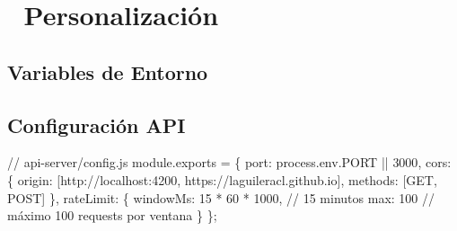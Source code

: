\documentclass[
  11pt,
  letterpaper,
  oneside,
  openany]{scrbook}
\newenvironment{Shaded}{}{}
\newcommand{\AttributeTok}[1]{\textcolor[rgb]{0.84,0.23,0.29}{#1}}
\newcommand{\BuiltInTok}[1]{\textcolor[rgb]{0.84,0.23,0.29}{#1}}
\newcommand{\CommentTok}[1]{\textcolor[rgb]{0.42,0.45,0.49}{#1}}
\newcommand{\DataTypeTok}[1]{\textcolor[rgb]{0.84,0.23,0.29}{#1}}
\newcommand{\DecValTok}[1]{\textcolor[rgb]{0.00,0.36,0.77}{#1}}
\newcommand{\FunctionTok}[1]{\textcolor[rgb]{0.44,0.26,0.76}{#1}}
\newcommand{\NormalTok}[1]{\textcolor[rgb]{0.14,0.16,0.18}{#1}}
\newcommand{\OperatorTok}[1]{\textcolor[rgb]{0.14,0.16,0.18}{#1}}
\newcommand{\StringTok}[1]{\textcolor[rgb]{0.01,0.18,0.38}{#1}}
\newcommand{\VariableTok}[1]{\textcolor[rgb]{0.89,0.38,0.04}{#1}}
\begin{document}
\section{🔧 Personalización}\label{personalizaciuxf3n-2}

\subsection{Variables de Entorno}\label{variables-de-entorno}

\begin{Shaded}
\end{Shaded}

\subsection{Configuración API}\label{configuraciuxf3n-api}

\begin{Shaded}
\begin{Highlighting}[]
\CommentTok{// api{-}server/config.js}
\NormalTok{module}\OperatorTok{.}\AttributeTok{exports} \OperatorTok{=}\NormalTok{ \{}
  \DataTypeTok{port}\OperatorTok{:} \BuiltInTok{process}\OperatorTok{.}\AttributeTok{env}\OperatorTok{.}\AttributeTok{PORT} \OperatorTok{||} \DecValTok{3000}\OperatorTok{,}
  \DataTypeTok{cors}\OperatorTok{:}\NormalTok{ \{}
    \DataTypeTok{origin}\OperatorTok{:}\NormalTok{ [}\StringTok{\textquotesingle{}http://localhost:4200\textquotesingle{}}\OperatorTok{,} \StringTok{\textquotesingle{}https://laguileracl.github.io\textquotesingle{}}\NormalTok{]}\OperatorTok{,}
    \DataTypeTok{methods}\OperatorTok{:}\NormalTok{ [}\StringTok{\textquotesingle{}GET\textquotesingle{}}\OperatorTok{,} \StringTok{\textquotesingle{}POST\textquotesingle{}}\NormalTok{]}
\NormalTok{  \}}\OperatorTok{,}
  \DataTypeTok{rateLimit}\OperatorTok{:}\NormalTok{ \{}
    \DataTypeTok{windowMs}\OperatorTok{:} \DecValTok{15} \OperatorTok{*} \DecValTok{60} \OperatorTok{*} \DecValTok{1000}\OperatorTok{,} \CommentTok{// 15 minutos}
    \DataTypeTok{max}\OperatorTok{:} \DecValTok{100} \CommentTok{// máximo 100 requests por ventana}
\NormalTok{  \}}
\NormalTok{\}}\OperatorTok{;}
\end{Highlighting}
\end{Shaded}
\end{document}
